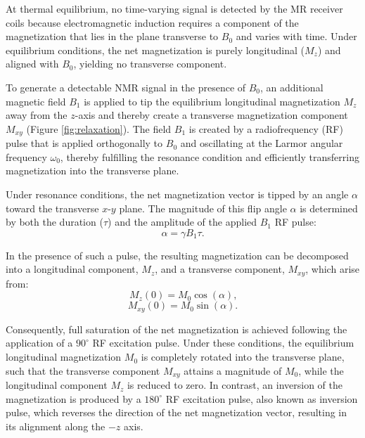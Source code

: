     \par At thermal equilibrium, no time-varying signal is detected by the MR receiver coils because electromagnetic induction requires a component of the magnetization that lies in the plane transverse to $B_{0}$ and varies with time. Under equilibrium conditions, the net magnetization is purely longitudinal ($M_{z}$) and aligned with $B_{0}$, yielding no transverse component.
    \par To generate a detectable NMR signal in the presence of $B_{0}$, an additional magnetic field $B_{1}$ is applied to tip the equilibrium longitudinal magnetization $M_{z}$ away from the $z$-axis and thereby create a transverse magnetization component $M_{xy}$ (Figure \ref{fig:relaxation}). The field $B_{1}$ is created by a radiofrequency (RF) pulse that is applied orthogonally to $B_{0}$ and oscillating at the Larmor angular frequency $\omega_{0}$, thereby fulfilling the resonance condition and efficiently transferring magnetization into the transverse plane.

\par Under resonance conditions, the net magnetization vector is tipped by an angle $\alpha$ toward the transverse $x\text{-}y$ plane. The magnitude of this flip angle $\alpha$ is determined by both the duration ($\tau$) and the amplitude of the applied $B_{1}$ RF pulse:
\begin{equation}
    \alpha=\gamma B_{1}\tau\text{.}
\end{equation}

In the presence of such a pulse, the resulting magnetization can be decomposed into a longitudinal component, $M_{z}$, and a transverse component, $M_{xy}$, which arise from:
\begin{equation}
    M_{z}(0)=M_{0}\cos(\alpha)\text{,}
    \label{eq:mz}
\end{equation}
\begin{equation}
    M_{xy}(0)=M_{0}\sin(\alpha)\text{.}
    \label{eq:test}
\end{equation}

\par Consequently, full saturation of the net magnetization is achieved following the application of a \(90^\circ\) RF excitation pulse. Under these conditions, the equilibrium longitudinal magnetization \(M_{0}\) is completely rotated into the transverse plane, such that the transverse component \(M_{xy}\) attains a magnitude of \(M_{0}\), while the longitudinal component \(M_{z}\) is reduced to zero. In contrast, an inversion of the magnetization is produced by a \(180^\circ\) RF excitation pulse, also known as inversion pulse, which reverses the direction of the net magnetization vector, resulting in its alignment along the \(-z\) axis. 


